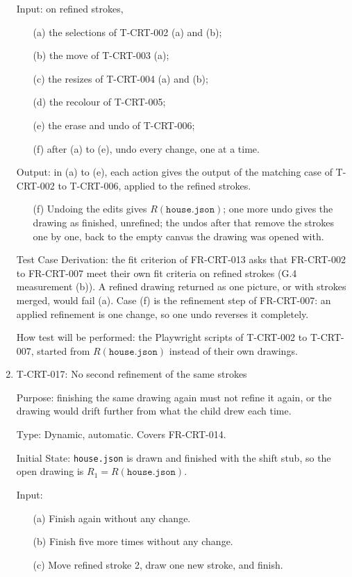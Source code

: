 \documentclass[12pt, titlepage]{article}
\newcommand{\testitem}[1]{\item #1\par\nopagebreak}
\begin{document}
\begin{enumerate}
Input: on refined strokes,
\begin{itemize}
\item[(a)] the selections of T-CRT-002 (a) and (b);
\item[(b)] the move of T-CRT-003 (a);
\item[(c)] the resizes of T-CRT-004 (a) and (b);
\item[(d)] the recolour of T-CRT-005;
\item[(e)] the erase and undo of T-CRT-006;
\item[(f)] after (a) to (e), undo every change, one at a time.
\end{itemize}

Output: in (a) to (e), each action gives the output of the matching case of
T-CRT-002 to T-CRT-006, applied to the refined strokes.
\begin{itemize}
\item[(f)] Undoing the edits gives $R(\texttt{house.json})$; one more undo
gives the drawing as finished, unrefined; the undos after that remove the
strokes one by one, back to the empty canvas the drawing was opened with.
\end{itemize}

Test Case Derivation: the fit criterion of FR-CRT-013 asks that FR-CRT-002 to
FR-CRT-007 meet their own fit criteria on refined strokes (G.4 measurement
(b)). A refined drawing returned as one picture, or with strokes merged,
would fail (a). Case (f) is the refinement step of FR-CRT-007: an applied
refinement is one change, so one undo reverses it completely.

How test will be performed: the Playwright scripts of T-CRT-002 to T-CRT-007,
started from $R(\texttt{house.json})$ instead of their own drawings.

\testitem{T-CRT-017: No second refinement of the same strokes}

Purpose: finishing the same drawing again must not refine it again, or the
drawing would drift further from what the child drew each time.

Type: Dynamic, automatic. Covers FR-CRT-014.

Initial State: \texttt{house.json} is drawn and finished with the shift
stub, so the open drawing is $R_1 = R(\texttt{house.json})$.

Input:
\begin{itemize}
\item[(a)] Finish again without any change.
\item[(b)] Finish five more times without any change.
\item[(c)] Move refined stroke 2, draw one new stroke, and finish.
\end{itemize}


\end{enumerate}
\end{document}
